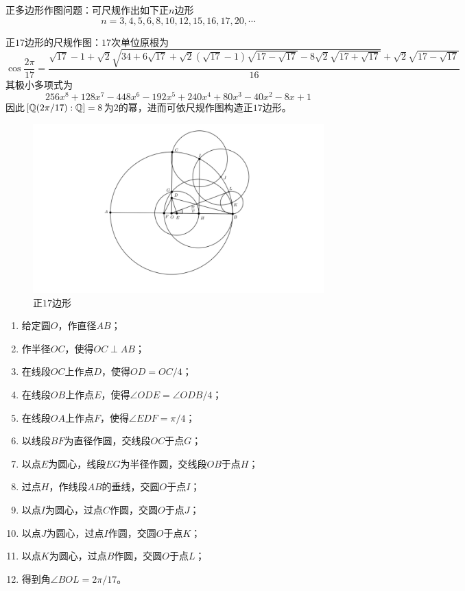 \begin{problem}
	正多边形作图问题：可尺规作出如下正$n$边形
	$$
	n=3,4,5,6,8,10,12,15,16,17,20,\cdots
	$$
\end{problem}

\begin{problem}
	正$17$边形的尺规作图：$17$次单位原根为%
	$$
	\cos\frac{2\pi}{17}=\frac{
		\sqrt{17}-1
		+\sqrt{2}\sqrt{34+6\sqrt{17}+\sqrt{2}(\sqrt{17}-1)\sqrt{17-\sqrt{17}}-8\sqrt{2}\sqrt{17+\sqrt{17}}}
		+\sqrt{2}\sqrt{17-\sqrt{17}}
	}{16}
	$$
	其极小多项式为%
	$$
	256 x^8+128 x^7-448 x^6-192 x^5+240 x^4+80 x^3-40 x^2-8 x+1
	$$
	因此$[\mathbb{Q}(2\pi/17):\mathbb{Q}]=8$为$2$的幂，进而可依尺规作图构造正$17$边形。
	\begin{figure}[H]
		\centering
		\includegraphics[scale = 0.3]{../figure/正17边形}
		\caption{正$17$边形}
	\end{figure}
	\begin{enumerate}
		\item 给定圆$O$，作直径$AB$；
		\item 作半径$OC$，使得$OC\perp AB$；
		\item 在线段$OC$上作点$D$，使得$OD=OC/4$；
		\item 在线段$OB$上作点$E$，使得$\angle ODE=\angle ODB/4$；
		\item 在线段$OA$上作点$F$，使得$\angle EDF=\pi/4$；
		\item 以线段$BF$为直径作圆，交线段$OC$于点$G$；
		\item 以点$E$为圆心，线段$EG$为半径作圆，交线段$OB$于点$H$；
		\item 过点$H$，作线段$AB$的垂线，交圆$O$于点$I$；
		\item 以点$I$为圆心，过点$C$作圆，交圆$O$于点$J$；
		\item 以点$J$为圆心，过点$I$作圆，交圆$O$于点$K$；
		\item 以点$K$为圆心，过点$B$作圆，交圆$O$于点$L$；
		\item 得到角$\angle BOL=2\pi/17$。
	\end{enumerate}
\end{problem}

